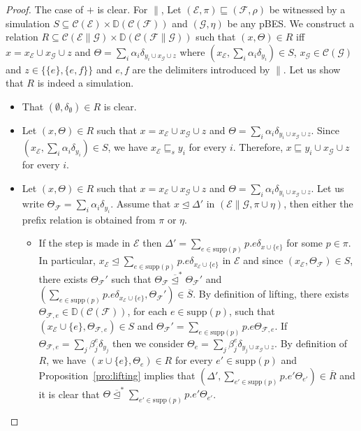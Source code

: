 \documentclass{llncs}
\newcommand{\C}{\mathcal{C}}
\newcommand{\D}{\mathbb{D}}
\newcommand{\EE}{\mathcal{E}}
\newcommand{\FF}{\mathcal{F}}
\newcommand{\G}{\mathcal{G}}
\newcommand{\refby}{\sqsubseteq}
\newcommand{\prefix}{\trianglelefteq}
\newcommand{\<}{\langle}
\renewcommand{\>}{\rangle}
\newcommand{\supp}{\mathrm{supp}}
\newcommand{\ov}[1]{\overline{#1}}
\begin{document}
\begin{proof}
The case of $+$ is clear. For $\|$, Let $(\EE,\pi)\refby(\FF,\rho)$ be witnessed by a simulation $S\subseteq\C(\EE)\times\D(\C(\FF))$ and $(\G,\eta)$ be any pBES. We construct a relation $R\subseteq\C(\EE\|\G)\times\D(\C(\FF\|\G))$ such that $(x,\Theta)\in R$ iff $x = x_\EE\cup x_\G\cup z$ and $\Theta = \sum_i\alpha_i\delta_{y_i\cup x_\G\cup z}$ where $(x_\EE,\sum_i\alpha_i\delta_{y_i})\in S$, $x_\G\in\C(\G)$ and $z \in\{ \{e\},\{e,f\}\}$ and $e,f$ are the delimiters introduced by $\|$. Let us show that $R$ is indeed a simulation.

\begin{itemize}
\item That $(\emptyset,\delta_\emptyset)\in R$ is clear.
\item Let $(x,\Theta)\in R$ such that $x = x_\EE\cup x_\G\cup z$ and $\Theta = \sum_i\alpha_i\delta_{y_i\cup x_\G\cup z}$. Since $(x_\EE,\sum_i\alpha_i\delta_{y_i})\in S$, we have $x_\EE\refby_s y_i$ for every $i$. Therefore, $x\refby y_i\cup x_\G\cup z$ for every $i$.
\item Let $(x,\Theta)\in R$ such that $x = x_\EE\cup x_\G\cup z$ and $\Theta = \sum_i\alpha_i\delta_{y_i\cup x_\G\cup z}$. Let us write $\Theta_\FF = \sum_i\alpha_i\delta_{y_i}$. Assume that $x\prefix\Delta'$ in $(\EE\|\G,\pi\cup \eta)$, then either the prefix relation is obtained from $\pi$ or $\eta$.
\begin{itemize}
\item If the step is made in $\EE$ then 
$\Delta' = \sum_{e\in\supp(p)}p.e\delta_{x\cup\{e\}}$ for some $p\in\pi$. In particular, $x_\EE\prefix\sum_{e\in\supp(p)}p.e\delta_{x_\EE\cup\{e\}}$ in $\EE$ and since $(x_\EE,\Theta_\FF)\in S$, there exists $\Theta_\FF'$ such that $\Theta_\FF\ov\prefix^*\Theta_\FF'$ and $(\sum_{e\in\supp(p)}p.e\delta_{x_\EE\cup\{e\}},\Theta_\FF')\in\ov S$. By definition of lifting, there exists $\Theta_{\FF,e}\in\D(\C(\FF))$, for each $e\in\supp(p)$, such that $(x_\EE\cup\{e\},\Theta_{\FF,e})\in S$ and $\Theta_\FF' = \sum_{e\in\supp(p)}p.e\Theta_{\FF,e}$. If $\Theta_{\FF,e} = \sum_j\beta_j^e\delta_{y_j}$ then we consider $\Theta_{e} = \sum_j\beta_j^e\delta_{y_j\cup x_\G\cup z}$. By definition of $R$, we have $(x\cup\{e\},\Theta_{e})\in R$ for every $e'\in\supp(p)$ and Proposition~\ref{pro:lifting} implies that $(\Delta',\sum_{e'\in\supp(p)}p.e'\Theta_{e'})\in \ov R$ and it is clear that $\Theta\ov\prefix^*\sum_{e'\in\supp(p)}p.e'\Theta_{e'}$.


\end{itemize}
\end{itemize}
\end{proof}
\end{document}
